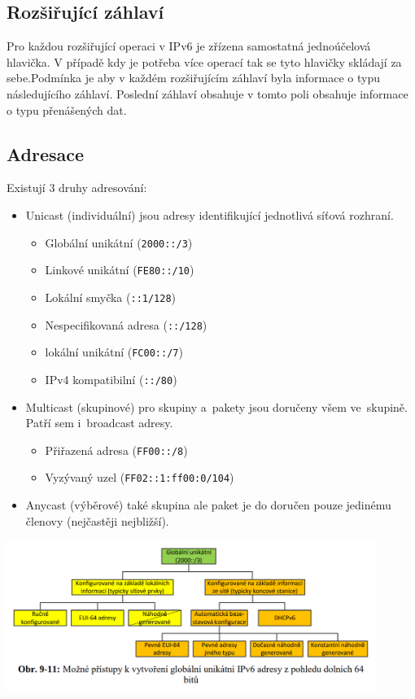 \subsection{Rozšiřující záhlaví}

Pro každou rozšiřující operaci v IPv6 je zřízena samostatná jednoúčelová hlavička.
V případě kdy je potřeba více operací tak se tyto hlavičky skládají za sebe.Podmínka je aby v každém rozšiřujícím záhlaví byla informace o typu následujícího záhlaví.
Poslední záhlaví obsahuje v tomto poli obsahuje informace o typu přenášených dat.

\subsection{Adresace}

Existují 3 druhy adresování:
\begin{itemize}[noitemsep]
    \item Unicast (individuální) jsou adresy identifikující jednotlivá síťová rozhraní.
    \begin{itemize}[noitemsep]
        \item Globální unikátní (\texttt{2000::/3})
        \item Linkové unikátní (\texttt{FE80::/10})
        \item Lokální smyčka (\texttt{::1/128})
        \item Nespecifikovaná adresa (\texttt{::/128})
        \item lokální unikátní (\texttt{FC00::/7})
        \item IPv4 kompatibilní (\texttt{::/80})
    \end{itemize}
    \item Multicast (skupinové) pro skupiny a~pakety jsou doručeny všem ve~skupině. Patří sem i~broadcast adresy.
    \begin{itemize}[noitemsep]
        \item Přiřazená adresa (\texttt{FF00::/8})
        \item Vyzývaný uzel (\texttt{FF02::1:ff00:0/104})
    \end{itemize}
    \item Anycast (výběrové) také skupina ale paket je do doručen pouze jedinému členovy (nejčastěji nejbližší).
\end{itemize}

\begin{center}
	\includegraphics[width=0.9\textwidth]{obrazky/071.png}
\end{center}


